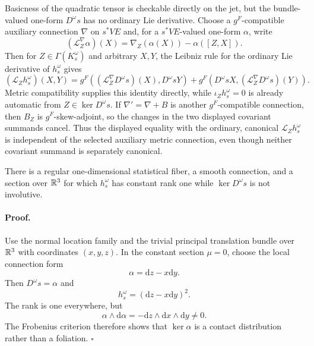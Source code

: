 Basicness of the quadratic tensor is checkable directly on the jet, but the
bundle-valued one-form $D^\omega s$ has no ordinary Lie derivative.  Choose a
$g^F$-compatible auxiliary connection $\nabla$ on $s^*VE$ and, for a
$s^*VE$-valued one-form $\alpha$, write
\begin{equation}
(\mathcal L_Z^\nabla\alpha)(X)
=\nabla_Z(\alpha(X))-\alpha([Z,X]).
\label{eq:pb-covariant-lie-derivative}
\end{equation}
Then for $Z\in\Gamma(K_s^\omega)$ and arbitrary $X,Y$, the Leibniz rule for
the ordinary Lie derivative of $h_s^\omega$ gives
\begin{equation}
(\mathcal L_Zh_s^\omega)(X,Y)
=g^F\left((\mathcal L_Z^\nabla D^\omega s)(X),D^\omega sY\right)
+g^F\left(D^\omega sX,(\mathcal L_Z^\nabla D^\omega s)(Y)\right).
\label{eq:pb-basicness-criterion}
\end{equation}
Metric compatibility supplies this identity directly, while
$\iota_Zh_s^\omega=0$ is already automatic from $Z\in\ker D^\omega s$.
If $\nabla'=\nabla+B$ is another $g^F$-compatible connection, then $B_Z$ is
$g^F$-skew-adjoint, so the changes in the two displayed covariant summands
cancel.  Thus the displayed equality with the ordinary, canonical
$\mathcal L_Zh_s^\omega$ is independent of the selected auxiliary metric
connection, even though neither covariant summand is separately canonical.

There is a regular one-dimensional statistical fiber, a smooth connection,
and a section over $\mathbb R^3$ for which $h_s^\omega$ has constant rank one while
$\ker D^\omega s$ is not involutive.  

\paragraph{Proof.}
Use the normal location family and the trivial principal translation bundle
over $\mathbb R^3$ with coordinates $(x,y,z)$.  In the constant section $\mu=0$,
choose the local connection form
\begin{equation}
\alpha=\mathrm{d}z-x\mathrm{d}y.
\label{eq:pb-contact-connection}
\end{equation}
Then $D^\omega s=\alpha$ and
\begin{equation}
h_s^\omega=(\mathrm{d}z-x\mathrm{d}y)^2.
\label{eq:pb-contact-pullback}
\end{equation}
The rank is one everywhere, but
\begin{equation}
\alpha\wedge\mathrm{d}\alpha
=-\mathrm{d}z\wedge\mathrm{d}x\wedge\mathrm{d}y\ne0.
\label{eq:pb-contact-frobenius}
\end{equation}
The Frobenius criterion therefore shows that $\ker\alpha$ is a contact
distribution rather than a foliation.  $\square$

